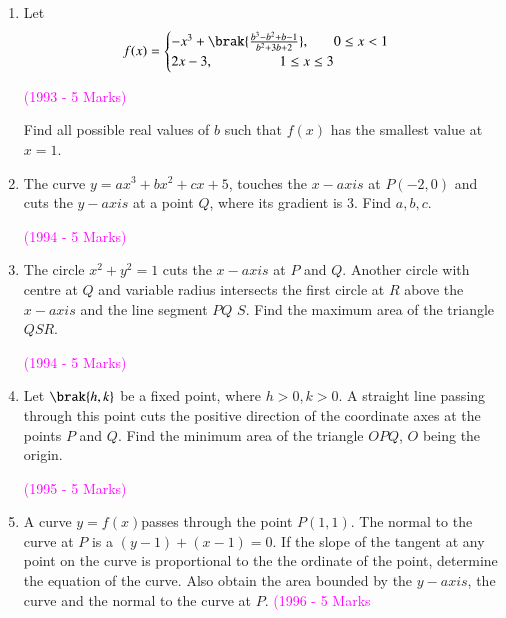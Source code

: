 \documentclass[journal,12pt,twocolumn]{IEEEtran}
\theoremstyle{remark}
\begin{document}
\begin{enumerate}
\item Let 
\[ f(x) = \begin{cases}
-x^3 + \brak{\frac{b^3-b^2+b-1}{b^2+3b+2}}, \ \ \ \ \ \ \ 0\leq x < 1\\
2x-3, \ \ \ \ \ \ \ \ \ \ \ \ \ \ \ \ \ \ \ 1\leq x \leq 3
\end{cases}
\]
\begin{flushright}
\hfill \textcolor{magenta}{(1993 - 5 Marks)}\\
\end{flushright}
Find all possible real values of $b$ such that $f(x)$ has the smallest value at $x=1$.

\item The curve $y = ax^3 + bx^2 + cx + 5$, touches the $x-axis$ at $P(-2,0)$ and cuts the $y-axis$ at a point $Q$, where its gradient is 3. Find $a, b, c$.
\begin{flushright}
\hfill \textcolor{magenta}{(1994 - 5 Marks)}\\
\end{flushright}

\item The circle $x^2 + y^2 = 1$ cuts the $x-axis$ at $P$ and $Q$. Another circle with centre at $Q$ and variable radius intersects the first circle at $R$ above the $x-axis$ and the line segment $PQ$ $S$. Find the maximum area of the triangle $QSR$.
\begin{flushright}
\hfill \textcolor{magenta}{(1994 - 5 Marks)}\\
\end{flushright}

\item Let $\brak{h,k}$ be a fixed point, where $h>0, k>0$. A straight line passing through this point cuts the positive direction of the coordinate axes at the points $P$ and $Q$. Find the minimum area of the triangle $OPQ$, $O$ being the origin.
\begin{flushright}
\hfill \textcolor{magenta}{(1995 - 5 Marks)}\\
\end{flushright}

\item A curve $y = f(x)$passes through the point $P(1,1)$. The normal to the curve at $P$ is a $(y-1) + (x-1) = 0$. If the slope of the tangent at any point on the curve is proportional to the the ordinate of the point, determine the equation of the curve. Also obtain the area bounded by the $y-axis$, the curve and the normal to the curve at $P$.
\hfill \textcolor{magenta}{(1996 - 5 Marks}\\


\end{enumerate}
\end{document}
